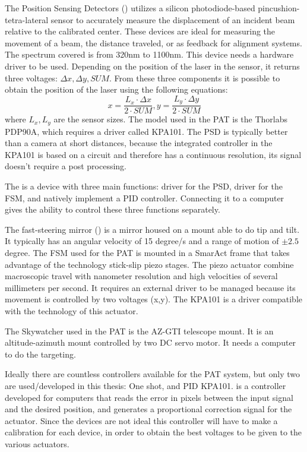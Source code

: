 The Position Sensing Detectors () utilizes a silicon photodiode-based pincushion-tetra-lateral sensor to accurately measure the displacement of an incident beam relative to the calibrated center. These devices are ideal for measuring the movement of a beam, the distance traveled, or as feedback for alignment systems.
The spectrum covered is from 320nm to 1100nm. This device needs a hardware driver to be used. Depending on the position of the laser in the sensor, it returns three voltages: $\Delta x, \Delta y, SUM$.
From these three components it is possible to obtain the position of the laser using the following equations:
$$x = \frac{L_x \cdot \Delta x}{2 \cdot SUM}, y = \frac{L_y \cdot \Delta y}{2 \cdot  SUM}$$
where $L_x,L_y$ are the sensor sizes. The model used in the PAT is the Thorlabs PDP90A, which requires a driver called KPA101.
The PSD is typically better than a camera at short distances, because the integrated controller in the KPA101 is based on a circuit and therefore has a continuous resolution, its signal doesn't require a post processing.

The  is a device with three main functions: driver for the PSD, driver for the FSM, and natively implement a PID controller. Connecting it to a computer gives the ability to control these three functions separately.


The fast-steering mirror () is a mirror housed on a mount able to do tip and tilt. It typically has an angular velocity of 15 degree/s and a range of motion of $\pm 2.5$ degree.
The FSM used for the PAT is mounted in a SmarAct frame that takes advantage of the technology stick-slip piezo stages. The piezo actuator combine macroscopic travel with nanometer resolution and high velocities of several millimeters per second.
It requires an external driver to be managed because its movement is controlled by two voltages (x,y). The KPA101 is a driver compatible with the technology of this actuator.

The Skywatcher used in the PAT is the AZ-GTI telescope mount. It is an altitude-azimuth mount controlled by two DC servo motor. It needs a computer to do the targeting.

Ideally there are countless controllers available for the PAT system, but only two are used/developed in this thesis: One shot, and PID KPA101.
 is a controller developed for computers that reads the error in pixels between the input signal and the desired position, and generates a proportional correction signal for the actuator.
Since the devices are not ideal this controller will have to make a calibration for each device, in order to obtain the best voltages to be given to the various actuators.

